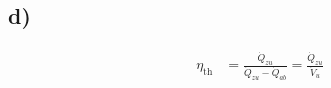

\subsection*{d)}

\begin{align*}
    \eta_{\text{th}} &= \frac{\dot{Q}_{zu}}{\dot{Q}_{zu} - \dot{Q}_{ab}} = \frac{\dot{Q}_{zu}}{\dot{V}_u}
\end{align*}